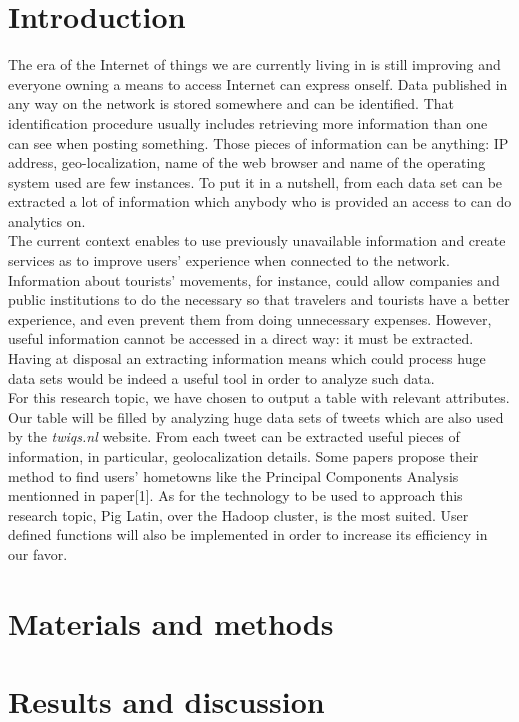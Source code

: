 \documentclass[conference]{doc}
\begin{document}
	\section{Introduction}
		\indent The era of the Internet of things we are currently living in is still
		improving and everyone owning a means to access Internet can express onself.
		Data published in any way on the network is stored somewhere and can be
		identified. That identification procedure usually includes retrieving more
		information than one can see when posting something. Those pieces of
		information can be anything: IP address, geo-localization, name of the web
		browser and name of the operating system used are few instances. To put it in
		a nutshell, from each data set can be extracted a lot of information which anybody who is provided an access to can do analytics on.\\
		\indent The current context enables to use previously unavailable information
		and create services as to improve users' experience when connected to the
		network. Information about tourists' movements, for instance, could allow
		companies and public institutions to do the necessary so that travelers and
		tourists have a better experience, and even prevent them from doing
		unnecessary expenses. However, useful information cannot be accessed in a
		direct way: it must be extracted. Having at disposal an extracting information
		means which could process huge data sets would be indeed a useful tool in
		order to analyze such data.\\
		\indent For this research topic, we have chosen to output a table with
		relevant attributes. Our table will be filled by analyzing huge data sets of
		tweets which are also used by the \emph{twiqs.nl} website. From each tweet can
		be extracted useful pieces of information, in particular, geolocalization
		details. Some papers propose their method to find users' hometowns like the
		Principal Components Analysis mentionned in paper[1]. As for the technology to
		be used to approach this research topic, Pig Latin, over the Hadoop cluster,
		is the most suited. User defined functions will also be implemented in order
		to increase its efficiency in our favor.
		
	\section{Materials and methods}
	
	\section{Results and discussion}
\end{document}
